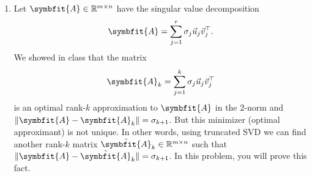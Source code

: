 \documentclass{article}
\theoremstyle{definition}
\newcommand{\reals}{\mathbb{R}}
\newcommand{\mat}[1]{\symbfit{#1}}
\begin{document}
\begin{enumerate}[leftmargin=\labelsep]
\begin{proof}
\begin{align*}
			              & = \frac{\mat{A}\vec{x}}{\norm{\mat{A}\vec{x}}_2}.
		      \end{align*}
		      Then in \cref{eq:Golubsetup} we have
		      \begin{align*}
			      \max_{\substack{\vec{y} \in \reals^m,                                                                                                 \\ \vec{x} \in \reals^n}} \frac{\vec{y}^\top \mat{A} \vec{x}}{\|\vec{y}\|_2\|\vec{x}\|_2} &= \max_{\substack{\vec{y}\in\reals^n \\\norm{\vec{y}}=1, \\ \vec{x} \in \reals^n}} \vec{y}^{\top} \frac{\mat{A}\vec{x}}{\norm{\vec{x}}_2}  \\
			       & = \max_{\vec{x} \in \reals^n} \qty( \frac{\mat{A}\vec{x}}{\norm{\mat{A}\vec{x}}_2})^{\top} \frac{\mat{A}\vec{x}}{\norm{\vec{x}}_2} \\
			       & = \max_{\vec{x} \in \reals^n} \frac{\norm{\mat{A}\vec{x}}_2^2}{\norm{\mat{A}\vec{x}}_2\norm{\vec{x}}_2}                            \\
			       & = \max_{\vec{x} \in \reals^n} \frac{\norm{\mat{A}\vec{x}}_2}{\norm{\vec{x}}_2}                                                     \\
			       & = \norm{\mat{A}}_2                                                                                                                 \\
			       & = \sigma_1(\mat{A}).
		      \end{align*}
	      \end{proof}

	\item Let \(\mat{A} \in \reals^{m \times n}\) have the singular value decomposition
	      \[
		      \mat{A} = \sum_{j = 1}^r \sigma_j \vec{u}_j\vec{v}_j^\top.
	      \]
	      We showed in class that the matrix
	      \[
		      \mat{A}_k = \sum_{j = 1}^k \sigma_j \vec{u}_j\vec{v}_j^\top
	      \]
	      is an optimal rank-\(k\) approximation to \(\mat{A}\) in the 2-norm and \(\|\mat{A} - \mat{A}_k\| = \sigma_{k+1}\). But this minimizer (optimal approximant) is not unique. In other words, using truncated SVD we can find another rank-\(k\) matrix \(\tilde{\mat{A}}_k \in \reals^{m\times n}\) such that \(\|\mat{A} - \tilde{\mat{A}}_k\| = \sigma_{k+1}\). In this problem, you will prove this fact.


\end{enumerate}
\end{document}
